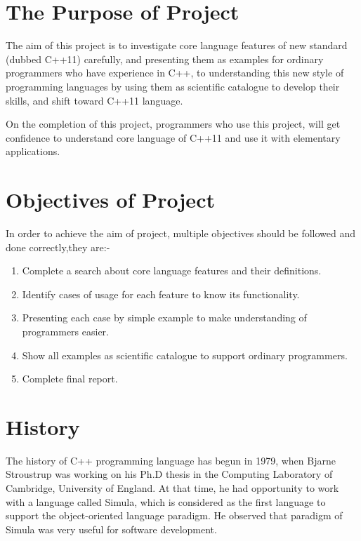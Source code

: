 \documentclass[11pt]{report}
\begin{document}
\section{The Purpose of Project}
\label{section:The purpose of project}
The aim of this project is to investigate core language  features of new \linebreak standard (dubbed C++11) carefully, and presenting them as examples for \linebreak ordinary programmers who have experience in C++, to understanding this new style of programming languages by using them as scientific  catalogue to develop their skills, and shift toward C++11 language.

On the completion of this project, programmers who use this project, will get confidence to understand core language of  C++11 and use it with \linebreak elementary applications.

\section{Objectives of Project}
\label{section:objectives of project}
In order to achieve the aim of project, multiple objectives should be followed and done correctly,they are:-
 \begin{enumerate}
   \item Complete a search about core language features and their definitions.
   \item Identify cases of usage for each feature  to know its functionality.
   \item Presenting each case by simple example to make understanding of \linebreak programmers easier.
   \item Show all examples as scientific catalogue to support ordinary \linebreak programmers.
   \item Complete final report.
 \end{enumerate}       
 
  
\section{History}
\label{section: History}
The history of C++ programming language has begun in 1979, when Bjarne Stroustrup was working on his Ph.D thesis in the Computing Laboratory of Cambridge, University of England. At that time, he had opportunity to work with a language called Simula, which is considered as the first language to support the object-oriented language paradigm. He observed that paradigm of Simula was very useful for software development\cite{StroustrupHistory}.
\end{document}
